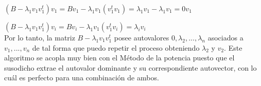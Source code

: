 $(B - \lambda_{1}v_{1}v_{1}^{t})v_{1} = Bv_{1} - \lambda_{1}v_{1}(v_{1}^{t}v_{1}) = \lambda_{1}v_{1} - \lambda_{1}v_{1} = 0v_{1}$

$(B - \lambda_{1}v_{1}v_{1}^{t})v_{i} = Bv_{i} - \lambda_{1}v_{1}(v_{1}^{t}v_{i}) = \lambda_{i}v_{i}$ \\

Por lo tanto, la matriz $B - \lambda_{1}v_{1}v_{1}^{t}$ posee autovalores $0, \lambda_{2}, ..., \lambda_{n}$ asociados a $v_{1}, ..., v_{n}$ de tal forma que puedo repetir el proceso obteniendo $\lambda_{2}$ y $v_{2}$. Este algoritmo se acopla muy bien con el M\'etodo de la potencia puesto que el susodicho extrae el autovalor dominante y su correspondiente autovector, con lo cu\'al es perfecto para una combinaci\'on de ambos.